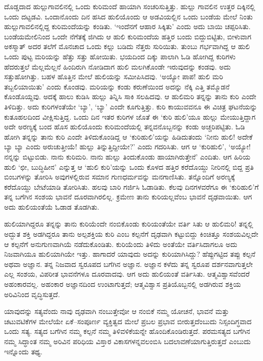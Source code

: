 ದೊಡ್ಡದಾದ ಹುಲ್ಲುಗಾವಲಿನಲ್ಲಿ ಒಂದು ಕುರಿಮಂದೆ ಹಾಯಾಗಿ ಸಂಚರಿಸುತ್ತಿತ್ತು. ಹುಲ್ಲು ಗಾವಲಿನ ಉತ್ತರ ದಿಕ್ಕಿನಲ್ಲಿ ಒಂದು ದಟ್ಟಡವಿ. ಒಂದಾನೊಂದು ದಿನ ಹಸಿದ ಹುಲಿಯೊಂದು ಆ ಅಡವಿಯಲ್ಲಿನ ಒಂದು ಬಂಡೆಯ ಮೇಲೆ ನಿಂತು ಹುಲ್ಲುಗಾವಲಿನಲ್ಲಿದ್ದ ಕುರಿಮಂದೆಯನ್ನು ಕಂಡಿತು. ‘ಇಂದೆನಗೆ ಆಹಾರ ಸಿಕ್ಕಿತು’ ಎಂದು ಅದು ಬಾಯಿ ಚಪ್ಪರಿಸಿತು. ಬಂಡೆಯ\break ಮೇಲಿನಿಂದ ಒಂದೇ ನೆಗೆತಕ್ಕೆ ಜಿಗಿದು ಆ ಹುಲಿ ಕುರಿಮಂದೆಯ ಹತ್ತಿರ ಬಂದು ಬಿದ್ದುಬಿಟ್ಟಿತು, ಬೀಳುವಾಗ ಅಕಸ್ಮಾತ್ ಅದರ ತಲೆಗೆ ಮೊನಚಾದ ಒಂದು ಕಲ್ಲು ಬಡಿದು ನೆತ್ತರು ಸುರಿಯಿತು. ತುಂಬು ಗರ್ಭವಾಗಿದ್ದ ಆ ಹುಲಿ ಒಂದು ಪುಟ್ಟ ಮರಿಯನ್ನು ಹೆತ್ತು ಸತ್ತು ಹೋಯಿತು. ಭಯದಿಂದ ದಿಕ್ಕು ಪಾಲಾಗಿ ಓಡಿ ಹೋಗಿದ್ದ ಕುರಿಗಳು ಹೆದರುತ್ತಲೆ ಮೆಲ್ಲಮೆಲ್ಲನೆ ಹಿಂದಿರುಗಿ ನೋಡಿದಾಗ ಹುಲಿ ಮಲಗಿಕೊಂಡೇ ಇರುವುದನ್ನು ಕಂಡವು. ಅದು ಸತ್ತುಹೋಗಿತ್ತು. ಬಹಳ ಹೊತ್ತಿನ ಮೇಲೆ ಹುಲಿಯನ್ನು ಸಮೀಪಿಸಿದವು. ‘ಅಯ್ಯೋ ಪಾಪ! ಹುಲಿ ಮರಿ ತಬ್ಬಲಿಯಾಯಿತು’ ಎಂದು ಕೊಂಡವು. ಮರಿಯನ್ನು ಕಂಡು ಕರುಣೆಯಿಂದ ಅದನ್ನು ನೆಕ್ಕಿ ಎತ್ತಿ ತಮ್ಮೊಡನೆ ಕೊಂಡೊಯ್ದವು. ಅದಕ್ಕೆ ಹಾಲು ಕುಡಿಸಿ ಹುಲ್ಲು ತಿನ್ನಿಸಿ ಸಾಕಿ ಸಲಹಿದವು. ಆ ಹುಲಿಮರಿ ತನ್ನನ್ನು ತಾನು ಕುರಿ ಎಂದೇ ತಿಳಿದಿತ್ತು. ಅದು ಕುರಿಗಳಂತೆಯೇ ‘ಬ್ಯಾ’, ‘ಬ್ಯಾ’ ಎಂದೇ ಕೂಗುತ್ತಿತ್ತು. ಕುರಿ ಕಾಯುವವನೂ ಈ ವಿಚಿತ್ರ ಘಟನೆಯನ್ನು ಕುತೂಹಲದಿಂದ ವೀಕ್ಷಿಸುತ್ತಿದ್ದ. ಒಂದು ದಿನ ಇತರ ಕುರಿಗಳ ಜೊತೆ ಈ ‘ಕುರಿ ಹುಲಿ’ಯೂ ಹುಲ್ಲು ಮೇಯುತ್ತಿದ್ದಾಗ ಅದೇ ಅರಣ್ಯಕ್ಕೆ ಬಂದ ಹೊಸ ಹುಲಿಯೊಂದು ಕುರಿಮಂದೆಯಲ್ಲಿ ತನ್ನವನೊಬ್ಬನನ್ನು ಕಂಡು ಅಚ್ಚರಿಪಟ್ಟಿತು. ಓಡಿ ಹೋಗಿ ತನ್ನನ್ನು ತಾನು ಕುರಿ ಎಂದೇ ತಿಳಿದುಕೊಂಡಿದ್ದ ಆ ‘ಕುರಿಹುಲಿ’ಯನ್ನು ಹಿಡಿದುತಂದು ‘ನೀನು ಹುಲಿ! ಅದೇಕೆ ಬ್ಯಾ ಬ್ಯಾ ಎಂದು ಅರುಚುತ್ತೀಯೆ! ಹುಲ್ಲು ತಿನ್ನುತ್ತಿದ್ದೀಯೇ?’ ಎಂದು ಗದರಿಸಿತು. ಆಗ ಆ ‘ಕುರಿಹುಲಿ’, ‘ಅಯ್ಯೋ! ನನ್ನನ್ನು ಬಿಟ್ಟುಬಿಡು. ನಾನು ಕುರಿಮರಿ. ನಾನು ಹುಲ್ಲು ತಿಂದುಕೊಂಡು ಹಾಯಾಗಿರುತ್ತೇನೆ’ ಎಂದಿತು. ಆಗ ಹಿರಿಯ ಹುಲಿ ‘ಛೀ, ಬುದ್ಧಿಹೀನ’ ಎನ್ನುತ್ತ ಆ ‘ಹುಲಿ ಕುರಿ’ಯನ್ನು ಒಂದು ಕೊಳದ ಹತ್ತಿರ ಕರೆದೊಯ್ದು ನೀರಿನಲ್ಲಿ ಬಿದ್ದ ಪ್ರತಿ ಬಿಂಬಗಳನ್ನು ತೋರಿಸಿ ಅವುಗಳಲ್ಲಿರುವ ಸಮಾನ ಗುಣಧರ್ಮವನ್ನು ಮನಗಾಣಿಸಿತು. ತನ್ನೊಂದಿಗೆ ಅರಣ್ಯಕ್ಕೆ ಕರೆದೊಯ್ದು ಬೇಟೆಯಾಡಿ ತೋರಿಸಿತು. ಹಲವು ಬಾರಿ ಗರ್ಜಿಸಿ ಓಡಾಡಿತು. ಕೆಲವು ದಿನಗಳವರೆಗೂ ಈ ‘ಕುರಿಹುಲಿ’ಗೆ ತನ್ನ ಬಗೆಗಿನ ಸಂಶಯ ಭಾವನೆ ದೂರವಾಗಿರಲಿಲ್ಲ. ಕ್ರಮೇಣ ತಾನು ಕುರಿಯಲ್ಲವೆಂಬ ಭಾವನೆ ದೃಢವಾಯಿತು. ಆಗ ಅದು ಹುಲಿಯಂತೆಯೆ ಓಡಾಡ ತೊಡಗಿತು.

ಹುಲಿಯಾಗಿದ್ದರೂ ತನ್ನನ್ನು ತಾನು ಕುರಿಯೆಂದೇ ನಂಬಿಕೊಂಡು ಕುರಿಯಂತೆಯೇ ವರ್ತಿ ಸಿತು ಆ ಹುಲಿಮರಿ! ತನ್ನಲ್ಲಿ ಅದ್ಭುತ ಶಕ್ತಿ ಅಡಗಿದ್ದರೂ ತಾನು ಅಲ್ಪಶಕ್ತಿಯ ಕುರಿ ಎಂಬ ಕಲ್ಪನೆಗೆ ದೃಢವಾಗಿ ಕಟ್ಟುಬಿದ್ದು ಕಿಂಚಿತ್ತೂ ಸಂಶಯವಿಲ್ಲದೇ ಆ ಕಲ್ಪನೆಗೆ ಅನುಗುಣವಾಗಿಯೆ ನಡೆದುಕೊಂಡಿತು. ಕುರಿಯೆಂದು ತಿಳಿದು ಅಂತೆಯೇ ವರ್ತಿಸಿದಾಗಲೂ ಅದು ನಿಜವಾಗಿಯೂ ಹುಲಿಯಾಗಿಯೇ ಇತ್ತು. ಹಾಗಾದರೆ ಯಾವುದು ಅದನ್ನು ಕುರಿಯಾಗಿಸಿದ್ದು? ಹೆಪ್ಪುಗಟ್ಟಿದ ತಪ್ಪು ಕಲ್ಪನೆ ಅಥವಾ ಅಜ್ಞಾನ. ತನ್ನ ನಿಜವಾದ ಸ್ವರೂಪದ ಬಗೆಗಿನ ಅಜ್ಞಾನ. ಅಜ್ಞಾನ ಕಳೆದು ತನ್ನ ಸ್ವರೂಪ ದರ್ಶನವಾಗುತ್ತಲೇ ಎಲ್ಲ ಸಂಶಯ, ವಿಪರೀತ ಭಾವನೆಗಳೂ ದೂರವಾದವು. ಆಗ ಅದು ಹುಲಿಯಂತೆ ವರ್ತಿಸಿತು. ಆತ್ಮವಿಶ್ವಾಸವೆಂದರೆ ಅಹಂಕಾರವಲ್ಲ. ಅಹಂಕಾರ ಅಜ್ಞಾನದಿಂದ ಉಂಟಾಗುತ್ತದೆ; ಆತ್ಮವಿಶ್ವಾಸ ಪ್ರತಿಯೊಬ್ಬನಲ್ಲಿ ಅಡಗಿರುವ ಶಕ್ತಿಯ ಅರಿವಿನಿಂದ ವೃದ್ಧಿಸುತ್ತದೆ.

ಯಾವುದನ್ನು ಸತ್ಯವೆಂದು ನಾವು ದೃಢವಾಗಿ ನಂಬುತ್ತೇವೋ ಆ ನಂಬಿಕೆ ನಮ್ಮ ಯೋಚನೆ, ಭಾವನೆ ಮತ್ತು ಚಟುವಟಿಕೆಗಳ ಮೇಲೆಯೇ ಏಕೆ–ಸಂಪೂರ್ಣ ವ್ಯಕ್ತಿತ್ವದ ಮೇಲೆ ಪ್ರಬಲ ಪ್ರಭಾವ ಬೀರುತ್ತದೆಂಬುದು ನಿಸ್ಸಂದಿಗ್ಧವಾದ ಒಂದು ಸತ್ಯ. ಸತ್ಯದ ಬಗೆಗಿನ ನಮ್ಮ ಕಲ್ಪನೆ ನಮ್ಮ ತಿಳಿ\-ವಳಿಕೆ\-ಯನ್ನೇ ಹೊಂದಿಕೊಂಡಿರುತ್ತದೆ. ಪರಮಸತ್ಯದ ಬಗೆಗಿನ ನಮ್ಮ ಸಿದ್ಧಾಂತ ನಮ್ಮ ಅರಿವಿನ ಪರಿಧಿಯ ವಿಸ್ತಾರ ವಿಕಾಸಗಳನ್ನವಲಂಬಿಸಿ ಬದಲಾವಣೆಯಾಗುತ್ತಿರುತ್ತದೆ ಎಂಬುದು ಇನ್ನೊಂದು ತಥ್ಯ.



